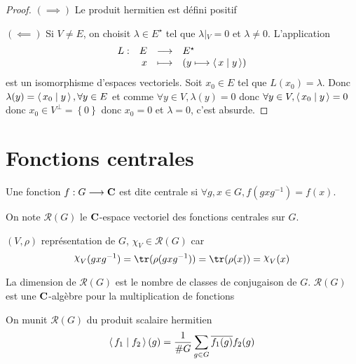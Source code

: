 \begin{proof}
    $(\implies )$ Le produit hermitien est défini positif

    $(\impliedby)$ Si $V\neq E$, on choisit  $ \lambda \in  E^\star$ tel que $ \lambda\left|_{V}\right.=0$ et $\lambda\neq 0 $. L'application \[
    \begin{array}{rrcl}
        L:& E & \longrightarrow & E^\star \\
          & x & \longmapsto & \displaystyle (y \longmapsto \scalar{x}{y} )
    \end{array}
    \] 
    est un isomorphisme d'espaces vectoriels. Soit $x_0 \in  E$ tel que $L(x_0)=\lambda$. Donc  $\lambda(y)= \scalar{x_0}{y} , \forall  y \in  E$ et comme $\forall  y \in  V, \lambda(y)=0$ donc $\forall y \in  V, \scalar{x_0}{y} =0$ donc $x_0 \in  V^\bot = \left\{ 0 \right\} $ donc $x_0=0$ et  $ \lambda=0$, c'est absurde.
\end{proof}

\section{Fonctions centrales}

\begin{dfn}
    Une fonction $f : G \longrightarrow  \mathbf C$ est dite centrale si $\forall  g , x \in  G, f(gxg^{-1})=f(x)$.
\end{dfn}

\begin{rem}[Notation]
    On note $\mathcal  R(G)$ le  $ \mathbf C$-espace vectoriel des fonctions centrales sur $G$.
\end{rem}


\begin{ex}
    $(V, \rho)$ représentation de  $G$,  $\chi_V \in  \mathcal  R(G)$ car \[
        \chi_V(gxg^{-1})=\tr(\rho(gxg^{-1}))=\tr(\rho(x))=\chi_V(x)
    \]
\end{ex}

\begin{rem}
    La dimension de $\mathcal  R(G)$ est le nombre de classes de conjugaison de $G$.  $\mathcal  R(G)$ est une $ \mathbf C$-algèbre pour la multiplication de fonctions
\end{rem}

On munit $\mathcal  R(G)$ du produit scalaire hermitien \[
    \scalar{f_1}{f_2}(g) =\frac1{\#G}\sum_{g \in  G} \bar{f_1(g)}f_2(g)
\] 
